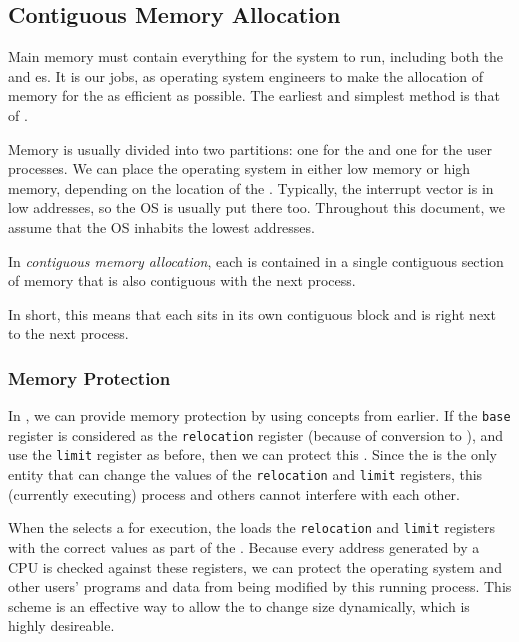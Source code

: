 \subsection{Contiguous Memory Allocation}\label{subsec:Contiguous_Memory_Allocation}
Main memory must contain everything for the system to run, including both the  and  es.
It is our jobs, as operating system engineers to make the allocation of memory for the  as efficient as possible.
The earliest and simplest method is that of .

Memory is usually divided into two partitions: one for the  and one for the user processes.
We can place the operating system in either low memory or high memory, depending on the location of the .
Typically, the interrupt vector is in low addresses, so the OS is usually put there too.
Throughout this document, we assume that the OS inhabits the lowest addresses.

\begin{definition}\label{def:Contiguous_Memory_Allocation}
  In \emph{contiguous memory allocation}, each  is contained in a single contiguous section of memory that is also contiguous with the next process.

  In short, this means that each  sits in its own contiguous block and is right next to the next process.
\end{definition}

\subsubsection{Memory Protection}\label{subsubsec:Contiguous_Memory_Protection}
In , we can provide memory protection by using concepts from earlier.
If the \texttt{base} register is considered as the \texttt{relocation} register (because of  conversion to ), and use the \texttt{limit} register as before, then we can protect this .
Since the  is the only entity that can change the values of the \texttt{relocation} and \texttt{limit} registers, this (currently executing) process and others cannot interfere with each other.

When the  selects a  for execution, the  loads the \texttt{relocation} and \texttt{limit} registers with the correct values as part of the .
Because every address generated by a CPU is checked against these registers, we can protect the operating system and other users’ programs and data from being modified by this running process.
This scheme is an effective way to allow the  to change size dynamically, which is highly desireable.

